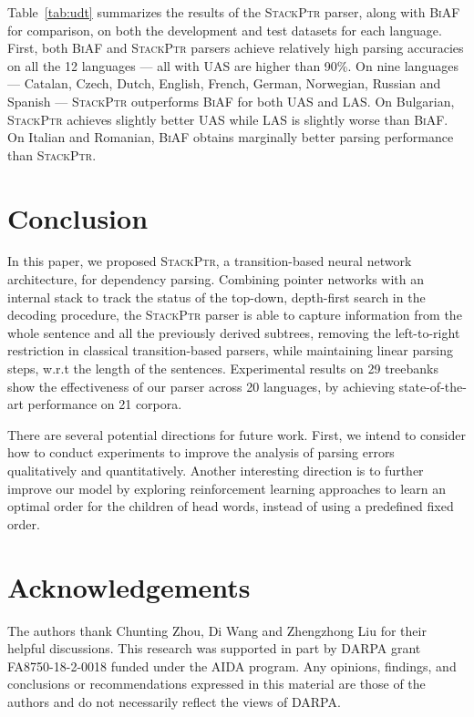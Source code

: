 \documentclass[11pt,a4paper]{article}
\begin{document}
Table~\ref{tab:udt} summarizes the results of the \textsc{StackPtr} parser, along with \textsc{BiAF} for comparison, on both the development and test datasets for each language.
First, both \textsc{BiAF} and \textsc{StackPtr} parsers achieve relatively high parsing accuracies on all the 12 languages --- all with UAS are higher than 90\%. 
On nine languages --- Catalan, Czech, Dutch, English, French, German, Norwegian, Russian and Spanish --- \textsc{StackPtr} outperforms \textsc{BiAF} for both UAS and LAS. 
On Bulgarian, \textsc{StackPtr} achieves slightly better UAS while LAS is slightly worse than \textsc{BiAF}.
On Italian and Romanian, \textsc{BiAF} obtains marginally better parsing performance than \textsc{StackPtr}.

\section{Conclusion}
In this paper, we proposed \textsc{StackPtr}, a transition-based neural network architecture, for dependency parsing.
Combining pointer networks with an internal stack to track the status of the top-down, depth-first search in the decoding procedure, the \textsc{StackPtr} parser is able to capture information from the whole sentence and all the previously derived subtrees, removing the left-to-right restriction in classical transition-based parsers, while maintaining linear parsing steps, w.r.t the length of the sentences.
Experimental results on 29 treebanks show the effectiveness of our parser across 20 languages, by achieving state-of-the-art performance on 21 corpora.

There are several potential directions for future work.
First, we intend to consider how to conduct experiments to improve the analysis of parsing errors qualitatively and quantitatively. 
Another interesting direction is to further improve our model by exploring reinforcement learning approaches to learn an optimal order for the children of head words, instead of using a predefined fixed order.

\section*{Acknowledgements}
The authors thank Chunting Zhou, Di Wang and Zhengzhong Liu for their helpful discussions.
This research was supported in part by DARPA
grant FA8750-18-2-0018 funded under the AIDA
program. Any opinions, findings, and conclusions
or recommendations expressed in this material are
those of the authors and do not necessarily reflect
the views of DARPA.
\end{document}

